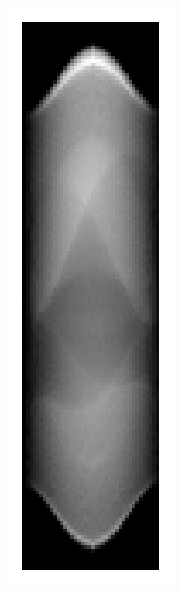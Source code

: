 \documentclass[12pt]{article}
\begin{document}
\begin{figure}
\centering
\begin{subfigure}{.073\textwidth}
    \centering
    \includegraphics[width=\textwidth]{../figures/data-full.png}

\end{subfigure}
\end{figure}
\end{document}
